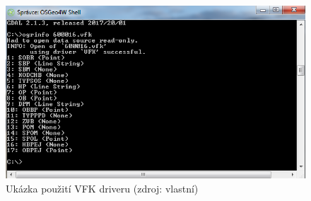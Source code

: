 \begin{figure}[H]
	 \centering
      \includegraphics[width=15cm]{./pictures/vfk_driver.png}
      \caption{Ukázka použití VFK driveru (zdroj: vlastní)}
      \label{fig:vfk_driver}
  \end{figure}
